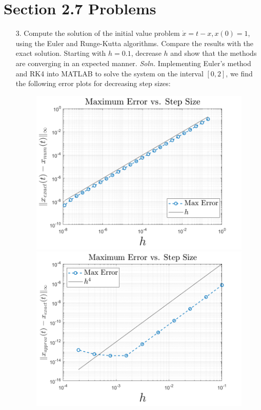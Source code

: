 \documentclass{article}
\begin{document}
\section*{Section 2.7 Problems}
\begin{itemize}
    \item[3.] Compute the solution of the initial value problem $\dot{x} = t - x, x(0) = 1$, using the Euler and Runge-Kutta algorithms. Compare the results with the exact solution. Starting with $h = 0.1$, decrease $h$ and show that the methods are converging in an expected manner. 
    \newline\newline
    \textit{Soln.} Implementing Euler's method and RK4 into MATLAB to solve the system on the interval $[0,2]$, we find the following error plots for decreasing step sizes:
    \begin{figure}[H]
    \centering
        \includegraphics[scale = 0.3]{eulerError.png}
        \includegraphics[scale = 0.3]{rk4Error.png}

\end{figure}
\end{itemize}
\end{document}
